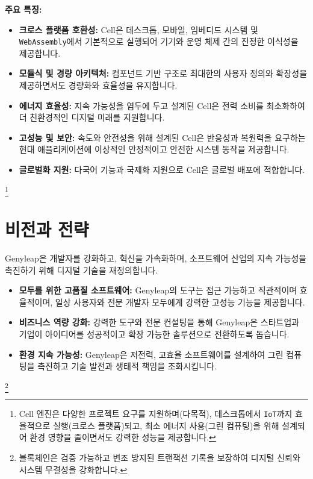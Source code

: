 \documentclass[a4paper,12pt,openany]{book}
\begin{document}
\textbf{주요 특징:}
\begin{itemize}
    \item \textbf{크로스 플랫폼 호환성:} Cell은 데스크톱, 모바일, 임베디드 시스템 및 \texttt{WebAssembly}에서 기본적으로 실행되어 기기와 운영 체제 간의 진정한 이식성을 제공합니다.
    \item \textbf{모듈식 및 경량 아키텍처:} 컴포넌트 기반 구조로 최대한의 사용자 정의와 확장성을 제공하면서도 경량화와 효율성을 유지합니다.
    \item \textbf{에너지 효율성:} 지속 가능성을 염두에 두고 설계된 Cell은 전력 소비를 최소화하여 더 친환경적인 디지털 미래를 지원합니다.
    \item \textbf{고성능 및 보안:} 속도와 안전성을 위해 설계된 Cell은 반응성과 복원력을 요구하는 현대 애플리케이션에 이상적인 안정적이고 안전한 시스템 동작을 제공합니다.
    \item \textbf{글로벌화 지원:} 다국어 기능과 국제화 지원으로 Cell은 글로벌 배포에 적합합니다.
\end{itemize}

\footnote{Cell 엔진은 다양한 프로젝트 요구를 지원하며(다목적), 데스크톱에서 \texttt{IoT}까지 효율적으로 실행(크로스 플랫폼)되고, 최소 에너지 사용(그린 컴퓨팅)을 위해 설계되어 환경 영향을 줄이면서도 강력한 성능을 제공합니다.}

\chapter{비전과 전략}

Genyleap은 개발자를 강화하고, 혁신을 가속화하며, 소프트웨어 산업의 지속 가능성을 촉진하기 위해 디지털 기술을 재정의합니다.

\begin{itemize}
    \item \textbf{모두를 위한 고품질 소프트웨어:} Genyleap의 도구는 접근 가능하고 직관적이며 효율적이며, 일상 사용자와 전문 개발자 모두에게 강력한 고성능 기능을 제공합니다.
    \item \textbf{비즈니스 역량 강화:} 강력한 도구와 전문 컨설팅을 통해 Genyleap은 스타트업과 기업이 아이디어를 성공적이고 확장 가능한 솔루션으로 전환하도록 돕습니다.
    \item \textbf{환경 지속 가능성:} Genyleap은 저전력, 고효율 소프트웨어를 설계하여 그린 컴퓨팅을 촉진하고 기술 발전과 생태적 책임을 조화시킵니다.
\end{itemize}

\footnote{블록체인은 검증 가능하고 변조 방지된 트랜잭션 기록을 보장하여 디지털 신뢰와 시스템 무결성을 강화합니다.}
\end{document}
